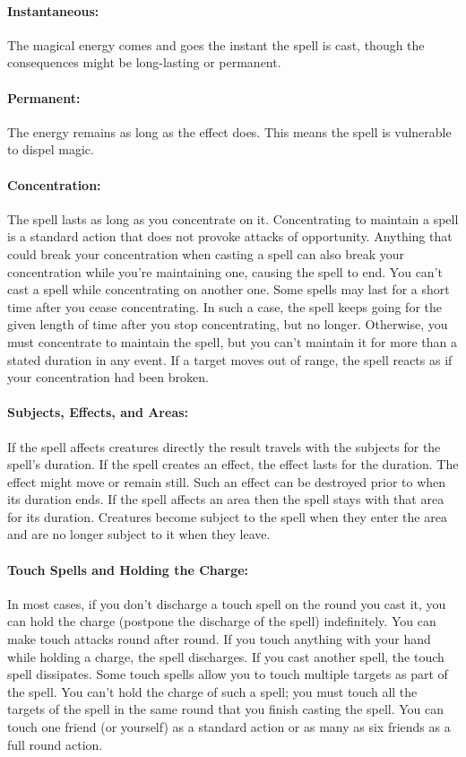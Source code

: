 \paragraph{Instantaneous:} The magical energy comes and goes the instant the spell is cast, though the consequences might be long-lasting or permanent.

\paragraph{Permanent:} The energy remains as long as the effect does. This means the spell is vulnerable to dispel magic.

\paragraph{Concentration:} The spell lasts as long as you concentrate on it. Concentrating to maintain a spell is a standard action that does not provoke attacks of opportunity. Anything that could break your concentration when casting a spell can also break your concentration while you're maintaining one, causing the spell to end. You can't cast a spell while concentrating on another one. Some spells may last for a short time after you cease concentrating. In such a case, the spell keeps going for the given length of time after you stop concentrating, but no longer. Otherwise, you must concentrate to maintain the spell, but you can't maintain it for more than a stated duration in any event. If a target moves out of range, the spell reacts as if your concentration had been broken.

\paragraph{Subjects, Effects, and Areas:} If the spell affects creatures directly the result travels with the subjects for the spell's duration. If the spell creates an effect, the effect lasts for the duration. The effect might move or remain still. Such an effect can be destroyed prior to when its duration ends. If the spell affects an area then the spell stays with that area for its duration. Creatures become subject to the spell when they enter the area and are no longer subject to it when they leave.

\paragraph{Touch Spells and Holding the Charge:} In most cases, if you don't discharge a touch spell on the round you cast it, you can hold the charge (postpone the discharge of the spell) indefinitely. You can make touch attacks round after round. If you touch anything with your hand while holding a charge, the spell discharges. If you cast another spell, the touch spell dissipates.
Some touch spells allow you to touch multiple targets as part of the spell. You can't hold the charge of such a spell; you must touch all the targets of the spell in the same round that you finish casting the spell. You can touch one friend (or yourself) as a standard action or as many as six friends as a full round action.

